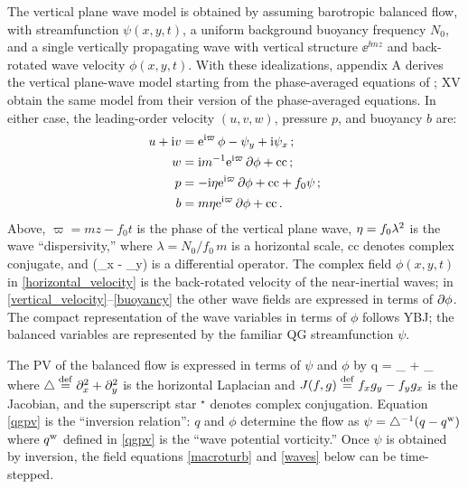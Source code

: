 \documentclass{jfm}
\newcommand{\NIW}{near-inertial wave}
\begin{document}
The vertical plane wave model  is obtained by  assuming barotropic balanced flow, with streamfunction $\psi(x,y,t)$, a uniform background buoyancy frequency $N_0$,  and a single vertically propagating wave  with vertical structure $\ee^{\ii m z}$ and back-rotated wave velocity $\phi(x,y,t)$. With these idealizations,  appendix A derives the vertical plane-wave model  starting from the phase-averaged equations of  \cite{wagner_young2016};   XV obtain the same model from their version of the phase-averaged equations. In either case, the leading-order  velocity $(u,v,w)$, pressure $p$, and buoyancy $b$ are:
\begin{align}
\label{horizontal_velocity}
u + {\rm i} v  &= {\rm e}^{{\rm i} \varpi}\,\phi -\psi_y + {\rm i}\psi_x\,;\\
  \label{vertical_velocity}
  w &= {\rm i} m^{-1}{\rm e}^{{\rm i} \varpi} \, \partial  \phi  + \text{cc}  \,;\\
\label{pressure}
\qquad p &= - {\rm i} \eta{\rm e}^{{\rm i} \varpi} \, \partial \phi
+\text{cc} + f_0 \psi \,;\\
\label{buoyancy}
b &=  m \eta{\rm e}^{{\rm i} \varpi} \, \partial \phi + \text{cc}
  \, .
\end{align}
Above, $\varpi = m z - f_0 t $ is the  phase of the vertical plane wave,
$\eta = f_0\lambda^2$ is the wave ``dispersivity,'' where
$\lambda = {N_0}/{f_0\, m}$ is a  horizontal scale, cc denotes
complex conjugate, and
\beq
\p {} \half (\p_x - \ii \p_y)
\eeq
is a differential operator. The complex field  $ \phi(x,y,t)$ in \eqref{horizontal_velocity}  is the  back-rotated velocity of the \NIW s;  in  \eqref{vertical_velocity}--\eqref{buoyancy} the  other wave fields   are  expressed in terms of  $\partial \phi$. The compact representation of the wave variables in terms of  $\phi$ follows YBJ; the balanced variables are represented by the familiar QG streamfunction $\psi$.


The PV of the balanced flow is expressed in terms of $\psi$ and $\phi$ by \beq
\label{qgpv}
q = \underbrace{\lap \psi}_{ \ze} +
                 _{ \qw}\com
\eeq
where $\triangle \stackrel{\mathrm{def}}{=} \partial_x^2 + \partial_y^2$ is the horizontal
Laplacian and $J(f,g) \stackrel{\mathrm{def}}{=} f_x g_y - f_y g_x$ is the Jacobian, and
the superscript star $^\star$ denotes complex conjugation. Equation \eqref{qgpv}
is the ``inversion relation'': $q$ and $\phi$ determine the flow
as $\psi = \triangle^{-1} (q - q^{\mathrm{w}}) $ where $q^{\mathrm{w}}$ defined in \eqref{qgpv} is the ``wave  potential vorticity.'' Once $\psi$ is obtained by inversion,
the field equations \eqref{macroturb} and \eqref{waves} below can be time-stepped.
\end{document}

